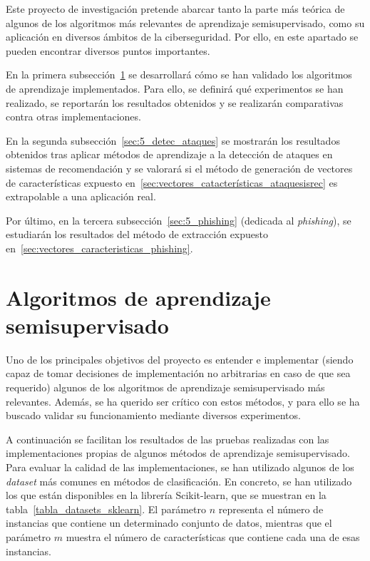
Este proyecto de investigación pretende abarcar tanto la parte más teórica de algunos de los algoritmos más relevantes de aprendizaje semisupervisado, como su aplicación en diversos ámbitos de la ciberseguridad. Por ello, en este apartado se pueden encontrar diversos puntos importantes.

En la primera subsección~\ref{sec:5_ssl} se desarrollará cómo se han validado los algoritmos de aprendizaje implementados. Para ello, se definirá qué experimentos se han realizado, se reportarán los resultados obtenidos y se realizarán comparativas contra otras implementaciones.

En la segunda subsección~\ref{sec:5_detec_ataques} se mostrarán los resultados obtenidos tras aplicar métodos de aprendizaje a la detección de ataques en sistemas de recomendación y se valorará si el método de generación de vectores de características expuesto en~\ref{sec:vectores_catacterísticas_ataquesisrec} es extrapolable a una aplicación real.

Por último, en la tercera subsección~\ref{sec:5_phishing} (dedicada al \textit{phishing}), se estudiarán los resultados del método de extracción expuesto en~\ref{sec:vectores_caracteristicas_phishing}.

\section{Algoritmos de aprendizaje semisupervisado}
\label{sec:5_ssl}

Uno de los principales objetivos del proyecto es entender e implementar (siendo capaz de tomar decisiones de implementación no arbitrarias en caso de que sea requerido) algunos de los algoritmos de aprendizaje semisupervisado más relevantes. Además, se ha querido ser crítico con estos métodos, y para ello se ha buscado validar su funcionamiento mediante diversos experimentos.

A continuación se facilitan los resultados de las pruebas realizadas con las implementaciones propias de algunos métodos de aprendizaje semisupervisado. Para evaluar la calidad de las implementaciones, se han utilizado algunos de los \textit{dataset} más comunes en métodos de clasificación. En concreto, se han utilizado los que están disponibles en la librería Scikit-learn, que se muestran en la tabla~\ref{tabla_datasets_sklearn}. El parámetro $n$ representa el número de instancias que contiene un determinado conjunto de datos, mientras que el parámetro $m$ muestra el número de características que contiene cada una de esas instancias.


